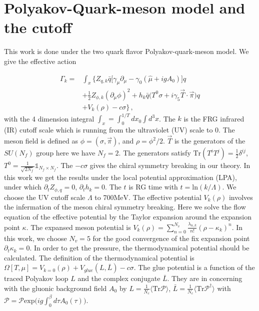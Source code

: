 \documentclass[%
reprint,
superscriptaddress,
showpacs,preprintnumbers,
 amsmath,amssymb,
 aps,
prl,
]{revtex4-1}
\begin{document}


\section{Polyakov-Quark-meson model and the cutoff}
\label{sec:pqm}




This work is done under the two quark flavor Polyakov-quark-meson model. We give the effective action

\begin{align}
  \Gamma_k=&\int_x \bigg\{Z_{q,k}\bar{q} \Big [\gamma_\mu \partial_\mu -\gamma_0(\hat\mu+igA_0) \Big ]q \nonumber\\[2ex]
  &+\frac{1}{2}Z_{\phi,k}(\partial_\mu \phi)^2\nonumber+h_k\bar{q}\big(T^0\sigma+i\gamma_5\vec{T}\cdot \vec{\pi}\big)q\\[2ex]
  &+V_k(\rho)-c\sigma \bigg\}\,,
\end{align}
with the 4 dimension integral $\int_x=\int^{1/T}_0dx_0\int d^3x$. The $k$ is the FRG infrared (IR) cutoff scale which is running from the ultraviolet (UV) scale to 0. The meson field is defined as $\phi=(\sigma,\vec{\pi})$, and $\rho=\phi^2/2$. $\vec{T}$ is the generators of the $SU(N_f)$ group here we have $N_f=2$. The generators satisfy $\mathrm{Tr}(T^iT^j)=\frac{1}{2}\delta^{ij}$, $T^0=\frac{1}{\sqrt{2N_f}}\mathbb{1}_{N_f\times N_f}$. The $-c\sigma$ gives the chiral symmetry breaking in our theory. In this work we get the results under the local potential approximation (LPA), under which $\partial_tZ_{\phi,q}=0$, $\partial_t h_k=0$. The $t$ is RG time with $t=\mathrm{ln}(k/\Lambda)$. We choose the UV cutoff scale $\Lambda$ to 700$\mathrm{MeV}$. The effective potential $V_k(\rho)$ involves the infermation of the meson chiral symmetry breaking. Here we solve the flow equation of the effective potential by the Taylor expansion around the expansion point $\kappa$. The expansed meson potential is $V_k(\rho)=\sum^{N_v}_{n=0}\frac{\lambda_{n,k}}{n!}(\rho-\kappa_k)^n$. In this work, we choose $N_v=5$ for the good convergence of the fix expansion point $\partial_t\kappa_k=0$. In order to get the pressure, the thermodynamical potential should be calculated. The definition of the thermodynamical potential is $\Omega[T,\mu]=V_{k=0}(\rho)+V_{glue}(L,\bar{L})-c\sigma$. The glue potential is a function of the traced Polyakov loop $L$ and the complex conjugate $\bar{L}$. They are in concerning with the gluonic background field $A_0$ by $L=\frac{1}{N_c}\langle \mathrm{Tr}\mathcal{P}\rangle$, $\bar{L}=\frac{1}{N_c}\langle \mathrm{Tr}\mathcal{P}^\dagger\rangle$ with $\mathcal{P}=\mathcal{P}\mathrm{exp}\big(ig\int^\beta_0d\tau A_0(\tau)\big)$. 
\end{document}
